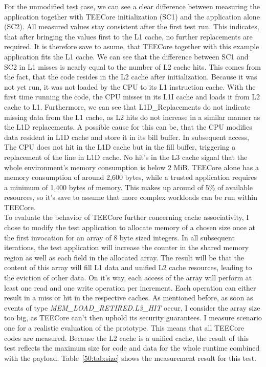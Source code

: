 For the unmodified test case, we can see a clear difference between measuring
the application together with TEECore initialization (SC1) and the application
alone (SC2). All measured values stay consistent after the first test run. This
indicates, that after bringing the values first to the L1 cache, no further
replacements are required. It is therefore save to asume, that TEECore together
with this example application fits the L1 cache. We can see that the difference
between SC1 and SC2 in L1 misses is nearly equal to the number of L2 cache hits.
This comes from the fact, that the code resides in the L2 cache after
initialization. Because it was not yet run, it was not loaded by the CPU to its
L1 instruction cache. With the first time running the code, the CPU misses in
its L1I cache and loads it from L2 cache to L1. Furthermore, we can see that
L1D\_Replacements do not indicate missing data from the L1 cache, as L2 hits do
not increase in a similar manner as the L1D replacements. A possible cause for
this can be, that the CPU modifies data resident in L1D cache and store it in
its bill buffer. In subsequent access, The CPU does not hit in the L1D cache but
in the fill buffer, triggering a replacement of the line in L1D cache. No hit's
in the L3 cache signal that the whole environment's memory consumption is below
2 MiB. TEECore alone has a memory consumption of around 2,600 bytes, while a
trusted application requires a minimum of 1,400 bytes of memory. This makes up
around of 5\% of available resources, so it's save to assume that more complex
workloads can be run within TEECore.\\

To evaluate the behavior of TEECore further concerning cache associativity, I
chose to modify the test application to allocate memory of a chosen size once at
the first invocation for an array of 8 byte sized integers. In all subsequent
iterations, the test application will increase the counter in the shared memory
region as well as each field in the allocated array. The result will be that the
content of this array will fill L1 data and unified L2 cache resources, leading
to the eviction of other data. On it's way, each access of the array will
perform at least one read and one write operation per increment. Each operation
can either result in a miss or hit in the respective caches. As mentioned
before, as soon as events of type \textit{MEM\_LOAD\_RETIRED.L3\_HIT} occur, I
consider the array size too big, as TEECore can't then uphold its security
guarantees. I measure scenario one for a realistic evaluation of the prototype.
This means that all TEECore codes are measured. Because the L2 cache is a
unified cache, the result of this test reflects the maximum size for code and
data for the whole runtime combined with the payload. Table~\ref{50:tab:size}
shows the measurement result for this test.

